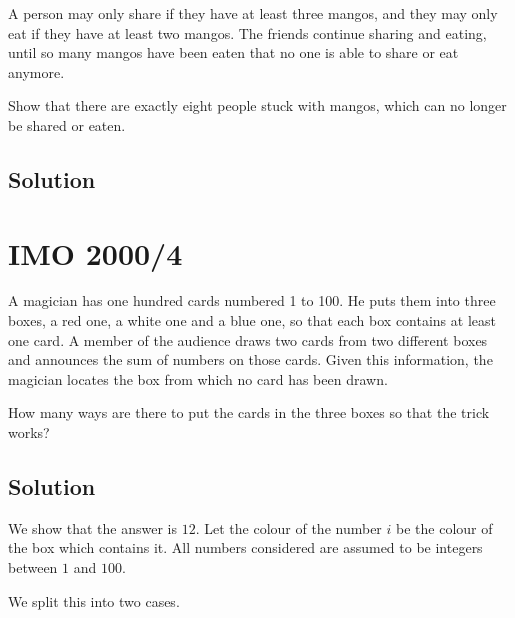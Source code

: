 \documentclass[blue,onecol]{shooting}
\begin{document}
A person may only share if they have at least three mangos, and they may only eat if they
have at least two mangos. The friends continue sharing and eating, until so many mangos
have been eaten that no one is able to share or eat anymore.

Show that there are exactly eight people stuck with mangos, which can no longer be shared or eaten.

\subsection{Solution}
 
\section{IMO 2000/4} 

A magician has one hundred cards numbered 1 to 100. He puts them into three boxes, a red one, a white one and a blue one, so that each box contains at least one card. A member of the audience draws two cards from two different boxes and announces the sum of numbers on those cards. Given this information, the magician locates the box from which no card has been drawn.

How many ways are there to put the cards in the three boxes so that the trick works?

\subsection{Solution}

We show that the answer is $12$. Let the colour of the number $i$ be the colour of the box which contains it. All numbers considered are assumed to be integers between $1$ and $100$.

We split this into two cases.
\end{document}
